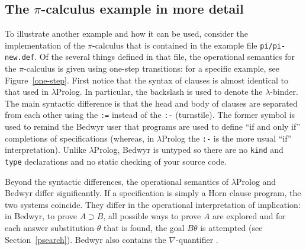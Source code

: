 \documentclass{article}
\newcommand{\lp}{$\lambda$Prolog}
\begin{document}
\subsection{The $\pi$-calculus example in more detail}
\label{pi-examples}

To illustrate another example and how it
can be used, consider the implementation of the $\pi$-calculus that is
contained in the example file \verb+pi/pi-new.def+.  Of the several
things defined in that file, the operational semantics for the
$\pi$-calculus is given using one-step transitions: for a specific
example, see Figure~\ref{one-step}.  First notice that the syntax of
clauses is almost identical to that used in \lp{}.  In
particular, the backslash is used to denote the $\lambda$-binder.  The
main syntactic difference is that the head and body of clauses are
separated from each other using the \verb+:=+ instead of the
\verb+:-+ (turnstile).  The former symbol is used to remind
the Bedwyr user that programs are used to define ``if and only if''
completions of specifications (whereas, in \lp{} the \verb+:-+ is the
more usual ``if'' interpretation).  Unlike \lp{}, Bedwyr is
untyped so there are no {\tt kind} and {\tt type} declarations and no
static checking of your source code.

Beyond the syntactic differences, the operational semantics of \lp{}
and Bedwyr differ significantly.  If a specification is simply a Horn
clause program, the two systems coincide. They differ in the operational
interpretation of implication: in Bedwyr, to prove $A\supset B$, all
possible ways to prove $A$ are explored and
for each answer substitution $\theta$ that is found, the goal
$B\theta$ is attempted (see Section~\ref{psearch}).  Bedwyr also
contains the $\nabla$-quantifier \cite{miller05tocl}.
\end{document}
